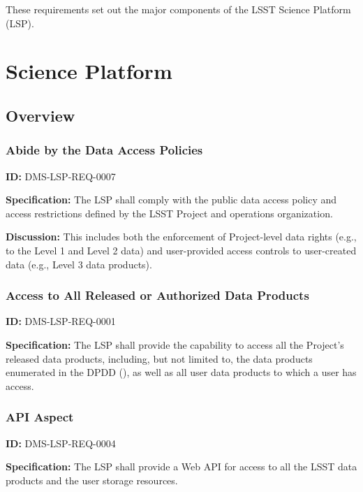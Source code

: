 \documentclass[SE,toc,lsstdraft]{lsstdoc}
\date{2018-05-08}
\begin{document}
\maketitle

These requirements set out the major components of the LSST Science Platform (LSP).
\section{Science Platform}

\subsection{Overview}

\subsubsection{Abide by the Data Access Policies}

\label{DMS-LSP-REQ-0007}
\textbf{ID:} DMS-LSP-REQ-0007

\textbf{Specification:}
The LSP shall comply with the public data access policy and access restrictions defined by the LSST Project and operations organization.

\textbf{Discussion:}
This includes both the enforcement of Project-level data rights (e.g., to the Level 1 and Level 2 data) and user-provided access controls to user-created data (e.g., Level 3 data products).

\subsubsection{Access to All Released or Authorized Data Products}

\label{DMS-LSP-REQ-0001}
\textbf{ID:} DMS-LSP-REQ-0001

\textbf{Specification:}
The LSP shall provide the capability to access all the Project's released data products, including, but not limited to, the data products enumerated in the DPDD (), as well as all user data products to which a user has access.

\subsubsection{API Aspect}

\label{DMS-LSP-REQ-0004}
\textbf{ID:} DMS-LSP-REQ-0004

\textbf{Specification:}
The LSP shall provide a Web API for access to all the LSST data products and the user storage resources.
\end{document}

